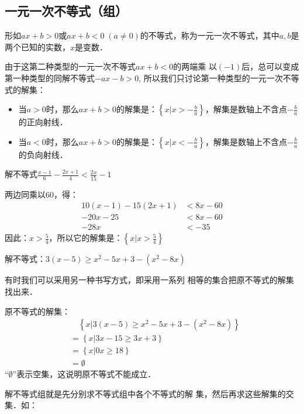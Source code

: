\subsection{一元一次不等式（组）}
形如$ax+b>0$或$ax+b<0\; (a\ne 0)$的不等式，称为一元一次不等式，其中$a,b$是两个已知的实数，$x$是变数．

由于这第二种类型的一元一次不等式$ax+b<0$的两端乘
以$(-1)$后，总可以变成第一种类型的同解不等式$-ax-b>
0$, 所以我们只讨论第一种类型的一元一次不等式的解集：

\begin{itemize}
    \item 当$a>0$时，那么$ax+b>0$的解集是：$\left\{x\Big|x>-\frac{b}{a}\right\}$，解集是数轴上不含点$-\frac{b}{a}$
的正向射线．
\item 当$a<0$时，那么$ax+b>0$的解集是：$\left\{x\Big|x<-\frac{b}{a}\right\}$，解集是数轴上不含点$-\frac{b}{a}$
的负向射线．
\end{itemize}

\begin{example}
    解不等式$\frac{x-1}{6}-\frac{2x+1}{4}<\frac{2x}{15}-1$
\end{example}

\begin{solution}
两边同乘以60，得：
\[\begin{split}
    10(x-1)-15(2x+1)&<8x-60\\
    -20x-25&<8x-60\\
    -28x&<-35
\end{split}
\]
因此：$x>\frac{5}{4}$，所以它的解集是：$\left\{x\Big|x>\frac{5}{4}\right\}$
\end{solution}

\begin{example}
    解不等式：$3(x-5)\ge x^2-5x+3-(x^2-8x)$
\end{example}

\begin{solution}
    有时我们可以采用另一种书写方式，即采用一系列
相等的集合把原不等式的解集找出来．

原不等式的解集：
\[\begin{split}
&\quad    \left\{x|3(x-5)\ge x^2-5x+3-(x^2-8x)\right\}\\
&=\left\{x|3x-15\ge 3x+3\right\}\\
&=\left\{x|0x\ge 18\right\}\\
&=\emptyset
\end{split}\]
“$\emptyset$”表示空集，这说明原不等式不能成立．

解不等式组就是先分别求不等式组中各个不等式的解
集，然后再求这些解集的交集．如：
\end{solution}

